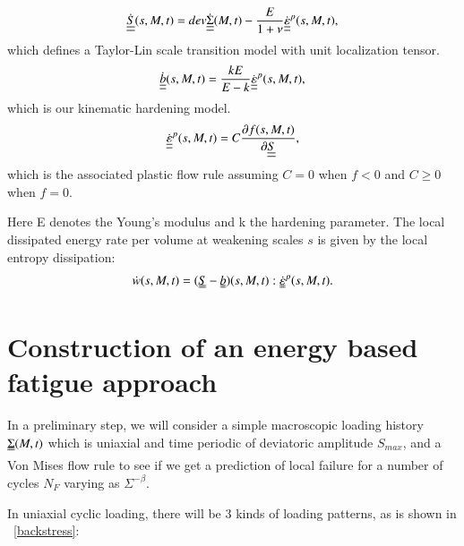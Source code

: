\documentclass[3p,times,number,review]{elsarticle}
\newcommand{\figref}[1]{\figurename~\ref{#1}}
\begin{document}
	\begin{equation}
    \dot{\uline{\uline{S}}}(s,M,t)=dev\dot{\uline{\uline{\Sigma}}}(M,t)-\dfrac{E}{1+\nu}\dot{\uline{\uline{\varepsilon}}}^p(s,M,t), 
	\end{equation}
     which defines a Taylor-Lin scale transition model with unit localization tensor\cite{Bosia201239}.
		\begin{equation}
		\dot{\uline{\uline{b}}}(s,M,t)=\dfrac{kE}{E-k} \dot{\uline{\uline{\varepsilon}}}^p(s,M,t), 
		\end{equation}
		which is our kinematic hardening model.
		\begin{equation}
		\dot{\uline{\uline{\varepsilon}}}^p(s,M,t)=C\dfrac{\partial f(s,M,t)}{\partial \uline{\uline{S}}}, 
		\end{equation}
		which is the associated plastic flow rule assuming $C=0$ when $f<0$ and  $C\geqslant0$ when $f=0$.

Here E denotes the Young's modulus and k the hardening parameter. The local dissipated energy rate per volume at weakening scales $s$  is given by the local entropy dissipation:
\begin{equation}
	\dot{w}(s,M,t)=(\uuline{S}-\uuline{b})(s,M,t):\uuline{\dot{\varepsilon}}^p(s,M,t).
	\label{dissipated}
\end{equation}

\section{Construction of an energy based fatigue approach}

In a preliminary step, we will consider a simple macroscopic loading history $\uuline{\Sigma}(M, t)$ which is uniaxial
and time periodic of deviatoric amplitude $S_{max}$, and a Von Mises flow rule to see if we get a prediction of local failure for a number of cycles $N_F$ varying as $\Sigma^{-\beta}.$


\noindent
In uniaxial cyclic loading, there will be 3 kinds of loading patterns, as is shown in \figref{backstress}:
\end{document}
